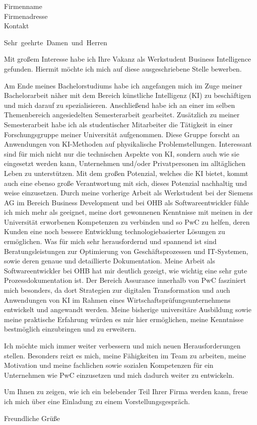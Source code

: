 \documentclass[
parskip=half,
fontsize=11pt, %
twoside=off, %
version=last,
foldmarks=false,
frommobilephone,
fromemail,
subject=titled,
backaddress=false,
]    
{scrlttr2}
\newcommand{\address}{
Firmenname    \\
Firmenadresse \\
Kontakt       \\
}
\begin{document}
\begin{letter}{\address}
  \opening{Sehr~geehrte~Damen~und~Herren}

  Mit großem Interesse habe ich Ihre Vakanz als Werkstudent Business Intelligence gefunden.
  Hiermit möchte ich mich auf diese ausgeschriebene Stelle bewerben.

  Am Ende meines Bachelorstudiums habe ich angefangen mich im Zuge meiner Bachelorarbeit näher mit dem Bereich künstliche Intelligenz (KI) zu beschäftigen und mich darauf zu spezialisieren.
  Anschließend habe ich an einer im selben Themenbereich angesiedelten Semesterarbeit gearbeitet.
  Zusätzlich zu meiner Semesterarbeit habe ich als studentischer Mitarbeiter die Tätigkeit in einer Forschungsgruppe meiner Universität aufgenommen.
  Diese Gruppe forscht an Anwendungen von KI-Methoden auf physikalische Problemstellungen.
  Interessant sind für mich nicht nur die technischen Aspekte von KI, sondern auch wie sie eingesetzt werden kann, Unternehmen und/oder Privatpersonen im alltäglichen Leben zu unterstützen.
  Mit dem großen Potenzial, welches die KI bietet, kommt auch eine ebenso große Verantwortung mit sich, dieses Potenzial nachhaltig und weise einzusetzen.
  Durch meine vorherige Arbeit als Werkstudent bei der Siemens AG im Bereich Business Development und bei OHB als Softwareentwickler fühle ich mich mehr als geeignet, meine dort gewonnenen Kenntnisse mit meinen in der Universität erworbenen Kompetenzen zu verbinden und so PwC zu helfen, deren Kunden eine noch bessere Entwicklung technologiebasierter Lösungen zu ermöglichen.
  Was für mich sehr herausfordernd und spannend ist sind Beratungsleistungen zur Optimierung von Geschäftsprozessen und IT-Systemen, sowie deren genaue und detaillierte Dokumentation.
  Meine Arbeit als Softwareentwickler bei OHB hat mir deutlich gezeigt, wie wichtig eine sehr gute Prozessdokumentation ist.
  Der Bereich Assurance innerhalb von PwC fasziniert mich besonders, da dort Strategien zur digitalen Transformation und auch Anwendungen von KI im Rahmen eines Wirtschaftsprüfungsunternehmens entwickelt und angewandt werden.
  Meine bisherige universitäre Ausbildung sowie meine praktische Erfahrung würden es mir hier ermöglichen, meine Kenntnisse bestmöglich einzubringen und zu erweitern.

  Ich möchte mich immer weiter verbessern und mich neuen Herausforderungen stellen.
  Besonders reizt es mich, meine Fähigkeiten im Team zu arbeiten, meine Motivation und meine fachlichen sowie sozialen Kompetenzen für ein Unternehmen wie PwC einzusetzen und mich dadurch weiter zu entwickeln.

  Um Ihnen zu zeigen, wie ich ein belebender Teil Ihrer Firma werden kann, freue ich mich über eine Einladung zu einem Vorstellungsgespräch.
  \closing{Freundliche Grüße}

\end{letter}
\end{document}
